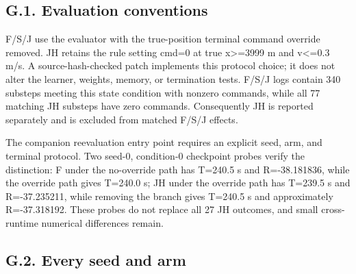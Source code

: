 \documentclass[letterpaper,journal,onecolumn]{IEEEtran}
\begin{document}
\subsection*{G.1. Evaluation conventions}

F/S/J use the evaluator with the true-position terminal command override removed. JH retains the rule setting cmd=0 at true x\textgreater=3999 m and v\textless=0.3 m/s. A source-hash-checked patch implements this protocol choice; it does not alter the learner, weights, memory, or termination tests. F/S/J logs contain 340 substeps meeting this state condition with nonzero commands, while all 77 matching JH substeps have zero commands. Consequently JH is reported separately and is excluded from matched F/S/J effects.

The companion reevaluation entry point requires an explicit seed, arm, and terminal protocol. Two seed-0, condition-0 checkpoint probes verify the distinction: F under the no-override path has T=240.5 s and R=-38.181836, while the override path gives T=240.0 s; JH under the override path has T=239.5 s and R=-37.235211, while removing the branch gives T=240.5 s and approximately R=-37.318192. These probes do not replace all 27 JH outcomes, and small cross-runtime numerical differences remain.

\subsection*{G.2. Every seed and arm}
\end{document}
